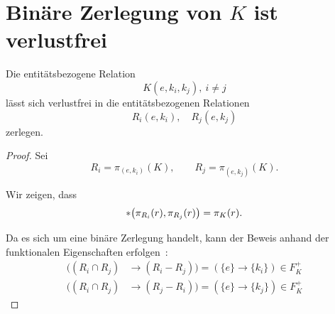 \chapter{Binäre Zerlegung von $K$ ist verlustfrei}

\bigskip
\begin{lemma}\label{lem:K_bin_ist_verlustfrei}
    Die entitätsbezogene Relation
    \[
        K(e, k_i, k_j), \ i \neq j
    \]
    lässt sich verlustfrei in die entitätsbezogenen Relationen
    \[
        R_{i}(e, k_i),\quad R_{j}(e, k_j)
    \]
    zerlegen.
\end{lemma}

\medskip
\begin{proof}
    Sei
    \[
        R_{i} = \pi_{(e,k_i)}(K),
        \qquad
        R_{j} = \pi_{(e,k_j)}(K).
    \]

    \noindent
    Wir zeigen, dass
    \[
        *\bigl(\pi_{R_{i}}(r), \pi_{R_{j}}(r)\bigr)
        =
        \pi_{K}(r).
    \]

    \bigskip
    \noindent
    Da es sich um eine binäre Zerlegung handelt, kann der Beweis anhand der funktionalen Eigenschaften erfolgen~\cite[S. 343]{EN11}:
    \[
        \begin{alignedat}{3}
            ((R_{i} \cap R_{j}) &\rightarrow (R_{i} - R_{j}))
            = (\{e\} \rightarrow \{k_i\}) \in F_{K}^+\\
            ((R_{i} \cap R_{j}) &\rightarrow (R_{j} - R_{i}))
            = (\{e\} \rightarrow \{k_j\}) \in F_{K}^+
        \end{alignedat}
    \]
\end{proof}